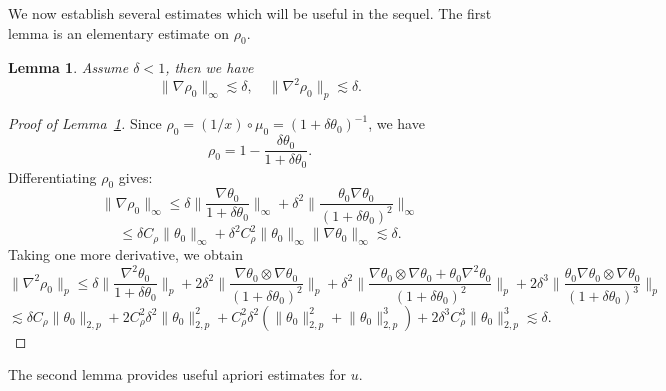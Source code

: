 \documentclass[12pt,letterpaper]{article}
\newtheorem{lem}[thm]{Lemma}
\theoremstyle{plain}
\begin{document}
We now establish several estimates which will be useful in the sequel. The first lemma is an elementary estimate on $\rho_0$.
\begin{lem}\label{Rho 0 Estimate}
Assume $\delta<1$, then we have
\begin{equation}
 \lVert\nabla\rho_0\rVert_\infty\lesssim \delta,\quad \lVert \nabla^2\rho_0\rVert_p\lesssim\delta.
\end{equation}
\end{lem}
\begin{proof}[Proof of Lemma~\ref{Rho 0 Estimate}]
 Since $\rho_0=(1/x)\circ \mu_0=(1+\delta\theta_0)^{-1}$, we have
 \begin{equation*}
 \rho_0=1-\frac{\delta\theta_0}{1+\delta\theta_0}.   
 \end{equation*}
 Differentiating $\rho_0$ gives:
 \begin{equation*}
  \lVert\nabla\rho_0\rVert_\infty\le \delta\bigg\lVert \frac{\nabla\theta_0}{1+\delta\theta_0}\bigg\rVert_\infty + \delta^2\bigg\lVert \frac{\theta_0\nabla\theta_0}{(1+\delta\theta_0)^2}\bigg\rVert_\infty 
 \end{equation*}
 \begin{equation*}
 \le \delta C_\rho\lVert \theta_0\rVert_\infty+\delta^2 C_\rho^2\lVert\theta_0\rVert_\infty\lVert\nabla\theta_0\rVert_\infty\lesssim \delta.    
 \end{equation*}
 Taking one more derivative, we obtain
 \begin{equation*}
 \lVert\nabla^2\rho_0\rVert_p \le  \delta\bigg\lVert \frac{\nabla^2\theta_0}{1+\delta\theta_0}\bigg\rVert_{p} +2\delta^2\bigg\lVert \frac{\nabla\theta_0\otimes\nabla\theta_0}{(1+\delta\theta_0)^2}\bigg\rVert_p +\delta^2\bigg\lVert \frac{\nabla\theta_0\otimes\nabla\theta_0+\theta_0\nabla^2\theta_0}{(1+\delta\theta_0)^2}\bigg\rVert_{p}+2\delta^3\bigg\lVert \frac{\theta_0\nabla\theta_0\otimes\nabla\theta_0}{(1+\delta\theta_0)^3}\bigg\rVert_{p}
 \end{equation*}
 \begin{equation*}
  \lesssim   \delta C_\rho\lVert\theta_0\rVert_{2,p}+2C_\rho^2\delta^2 \lVert\theta_0\rVert_{2,p}^2+C_\rho^2\delta^2(\lVert\theta_0\rVert_{2,p}^2+\lVert\theta_0\rVert_{2,p}^3)+2\delta^3 C_\rho^3 \lVert\theta_0\rVert_{2,p}^3\lesssim\delta.
 \end{equation*}
\end{proof}
The second lemma provides useful apriori estimates for $u$.
\end{document}
